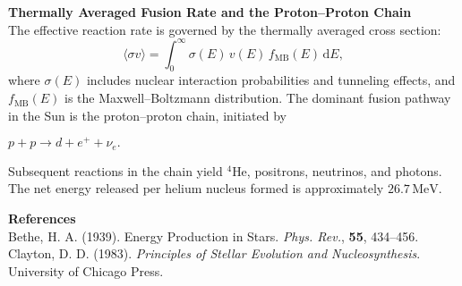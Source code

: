 \begin{technical}
    \vspace{0.2em}
    \textbf{Thermally Averaged Fusion Rate and the Proton–Proton Chain}\\[0.2em]
    The effective reaction rate is governed by the thermally averaged cross section:
    \[
    \langle \sigma v \rangle = \int_0^\infty \sigma(E)\, v(E)\, f_\text{MB}(E)\, \mathrm{d}E,
    \]
    where \(\sigma(E)\) includes nuclear interaction probabilities and tunneling effects, and \(f_\text{MB}(E)\) is the Maxwell–Boltzmann distribution. The dominant fusion pathway in the Sun is the proton–proton chain, initiated by \par
    $p + p \to d + e^+ + \nu_e.$ \par
    Subsequent reactions in the chain yield \( ^4\text{He} \), positrons, neutrinos, and photons. The net energy released per helium nucleus formed is approximately \(26.7\,\text{MeV}\).
    
    \vspace{0.5em}
    \textbf{References}\\
    Bethe, H. A. (1939). Energy Production in Stars. \textit{Phys. Rev.}, \textbf{55}, 434–456.\\
    Clayton, D. D. (1983). \textit{Principles of Stellar Evolution and Nucleosynthesis}. University of Chicago Press.
    \end{technical}
    